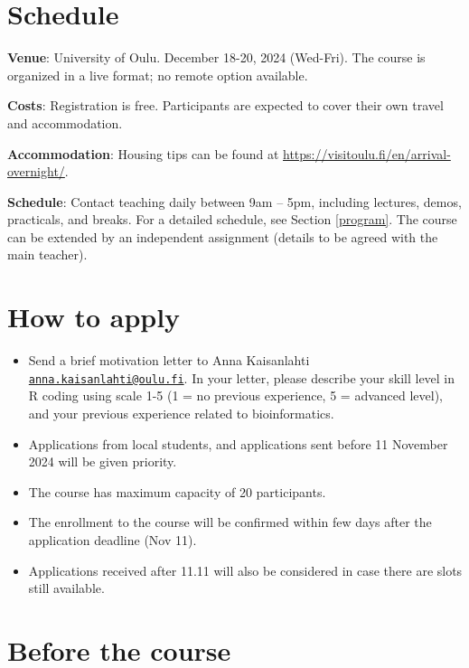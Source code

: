 \documentclass[
  oneside]{book}
\providecommand{\tightlist}{%
  \setlength{\itemsep}{0pt}\setlength{\parskip}{0pt}}
\begin{document}
\hypertarget{schedule}{%
\section{Schedule}\label{schedule}}

\textbf{Venue}: University of Oulu. December 18-20, 2024 (Wed-Fri). The course is organized in a live format; no remote option available.

\textbf{Costs}: Registration is free. Participants are expected to cover their own travel and accommodation.

\textbf{Accommodation}: Housing tips can be found at \url{https://visitoulu.fi/en/arrival-overnight/}.

\textbf{Schedule}: Contact teaching daily between 9am -- 5pm, including lectures, demos, practicals, and breaks. For a detailed schedule, see Section \ref{program}. The course can be extended by an independent assignment (details to be agreed with the main teacher).

\hypertarget{how-to-apply}{%
\section{How to apply}\label{how-to-apply}}

\begin{itemize}
\tightlist
\item
  Send a brief motivation letter to Anna Kaisanlahti \href{mailto:anna.kaisanlahti@oulu.fi}{\nolinkurl{anna.kaisanlahti@oulu.fi}}. In your letter, please describe your skill level in R coding using scale 1-5 (1 = no previous experience, 5 = advanced level), and your previous experience related to bioinformatics.
\item
  Applications from local students, and applications sent before 11 November 2024 will be given priority.
\item
  The course has maximum capacity of 20 participants.
\item
  The enrollment to the course will be confirmed within few days after the application deadline (Nov 11).
\item
  Applications received after 11.11 will also be considered in case there are slots still available.
\end{itemize}

\hypertarget{before-the-course}{%
\section{Before the course}\label{before-the-course}}
\end{document}
